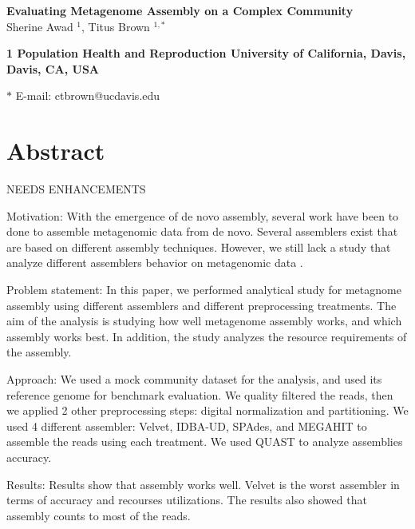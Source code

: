 \pagestyle{myheadings}



 



\begin{flushleft}
{\Large
\textbf{Evaluating Metagenome Assembly on a Complex Community}
}
\\
 
Sherine Awad $^{1}$, 
Titus Brown $^{1,\ast}$ 

\bf{1} Population Health and Reproduction
University of California, Davis, Davis, CA, USA 
 
 
$\ast$ E-mail:  ctbrown@ucdavis.edu 
\end{flushleft}

\section*{Abstract}
NEEDS ENHANCEMENTS

Motivation: With the emergence of de novo assembly, several work have been to done to assemble metagenomic data from de novo. Several assemblers exist that are based on different assembly techniques. However, we still lack  a study that analyze different assemblers behavior on metagenomic data . 


Problem statement: In this paper, we performed analytical study for metagnome assembly using different assemblers and different preprocessing treatments. The aim of the analysis is studying how well metagenome assembly works, and which assembly works best. In addition, the study analyzes the resource requirements of the assembly. 


Approach: We used a mock community dataset for the analysis, and used its reference genome for benchmark evaluation. We quality filtered the reads, then we applied 2 other preprocessing steps: digital normalization and partitioning. We used 4 different assembler: Velvet, IDBA-UD, SPAdes, and MEGAHIT to assemble the reads using each treatment. We used QUAST to analyze assemblies accuracy. 

Results: Results show that assembly works well. Velvet is the worst assembler in terms of accuracy and recourses utilizations. The results also showed that assembly counts to most of the reads. 
 
